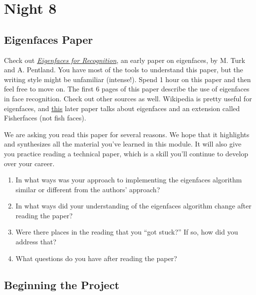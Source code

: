 \chapter{Night 8}

\section{Eigenfaces Paper}

Check out \href{https://drive.google.com/open?id=0B7LNBbaxYFujTkwxY1BZZEE2eWM}{\textit{Eigenfaces for Recognition}}, an early paper on eigenfaces, by M. Turk and A. Pentland. You have most of the tools to understand this paper, but the writing style might be unfamiliar (intense!). Spend 1 hour on this paper and then feel free to move on. The first 6 pages of this paper describe the use of eigenfaces in face recognition.
Check out other sources as well. Wikipedia is pretty useful for eigenfaces, and \href{https://drive.google.com/open?id=0B7LNBbaxYFujLUFfNThyT2JqNmc}{this} later paper talks about eigenfaces and an extension called Fisherfaces (not fish faces).

\begin{prob}
We are asking you read this paper for several reasons. We hope that it highlights and synthesizes all the material you've learned in this module. It will also give you practice reading a technical paper, which is a skill you'll continue to develop over your career.
\begin{enumerate}
    \item In what ways was your approach to implementing the eigenfaces algorithm similar or different from the authors' approach?
    \item In what ways did your understanding of the eigenfaces algorithm change after reading the paper?
    \item Were there places in the reading that you ``got stuck?'' If so, how did you address that?
    \item What questions do you have after reading the paper?
\end{enumerate}
\end{prob}

\section{Beginning the Project}

